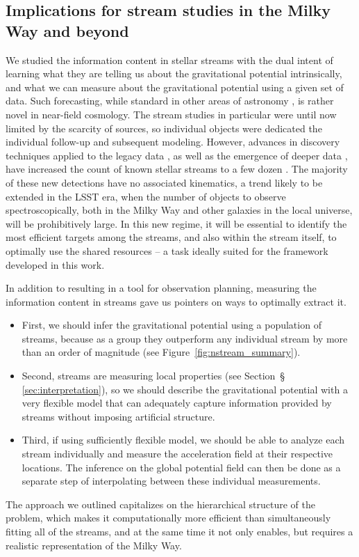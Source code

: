 \documentclass[modern]{aastex62}
\begin{document}
\subsection{Implications for stream studies in the Milky Way and beyond}
\label{sec:dis_applications}
We studied the information content in stellar streams with the dual intent of learning what they are telling us about the gravitational potential intrinsically, and what we can measure about the gravitational potential using a given set of data.
Such forecasting, while standard in other areas of astronomy \citep[e.g.,][]{bond1997,tegmark2000}, is rather novel in near-field cosmology.
The stream studies in particular were until now limited by the scarcity of sources, so individual objects were dedicated the individual follow-up and subsequent modeling.
However, advances in discovery techniques applied to the legacy data \citep{grillmair2014,grillmair2017a}, as well as the emergence of deeper data \citep{shipp2018}, have increased the count of known stellar streams to a few dozen \citep{grillmair2016}.
The majority of these new detections have no associated kinematics, a trend likely to be extended in the LSST era, when the number of objects to observe spectroscopically, both in the Milky Way and other galaxies in the local universe, will be prohibitively large.
In this new regime, it will be essential to identify the most efficient targets among the streams, and also within the stream itself, to optimally use the shared resources -- a task ideally suited for the framework developed in this work.

In addition to resulting in a tool for observation planning, measuring the information content in streams gave us pointers on ways to optimally extract it.
\begin{itemize}
\item{First, we should infer the gravitational potential using a population of streams, because as a group they outperform any individual stream by more than an order of magnitude (see Figure~\ref{fig:nstream_summary}).}
\item{Second, streams are measuring local properties (see Section~\S\,\ref{sec:interpretation}), so we should describe the gravitational potential with a very flexible model that can adequately capture information provided by streams without imposing artificial structure.}
\item{Third, if using sufficiently flexible model, we should be able to analyze each stream individually and measure the acceleration field at their respective locations.
The inference on the global potential field can then be done as a separate step of interpolating between these individual measurements.}
\end{itemize}
The approach we outlined capitalizes on the hierarchical structure of the problem, which makes it computationally more efficient than simultaneously fitting all of the streams, and at the same time it not only enables, but requires a realistic representation of the Milky Way.
\end{document}
